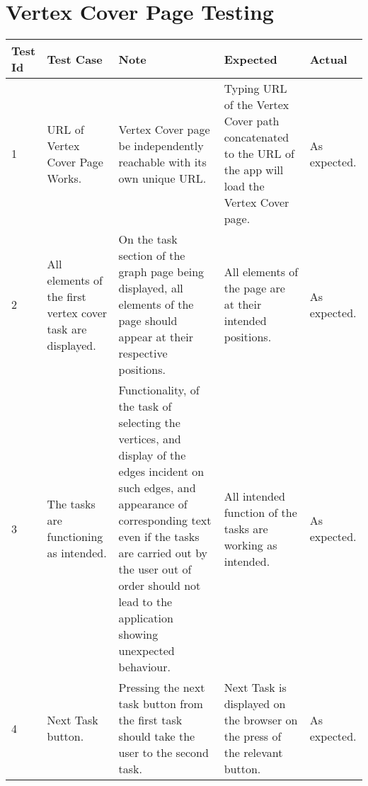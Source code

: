 \section{Vertex Cover Page Testing}
\begin{tabular}{ |p{1cm}|p{2cm}|p{4cm}|p{2cm}|p{2cm}| }
 \hline
 \textbf{Test Id} & \textbf{Test Case} & \textbf{Note} & \textbf{Expected} & \textbf{Actual} \\
 \hline
 1 
 & URL of Vertex Cover Page Works. 
 & Vertex Cover page be independently reachable with its own unique
   URL.
 & Typing URL of the Vertex Cover path concatenated to the URL of the app will load the
   Vertex Cover page.
 & As expected. \\
 \hline
 2 
 & All elements of the first vertex cover task are displayed.
 & On the task section of the graph page being displayed, all elements of
   the page should appear at their respective positions.
 & All elements of the page are at their intended positions.
 & As expected. \\
 \hline
 3 
 & The tasks are functioning as intended. 
 & Functionality, of the task of selecting the vertices, and display of the
 edges incident on such edges, and appearance of corresponding text even if the
 tasks are carried out by the user out of order should not lead to the
 application showing unexpected behaviour.
 & All intended function of the tasks are working as intended. 
 & As expected. \\
 \hline
 4 
 & Next Task button.
 & Pressing the next task button from the first task
   should take the user to the second task.
 & Next Task is displayed on the browser on the press of the relevant button.
 & As expected. \\
 \hline
\end{tabular}

